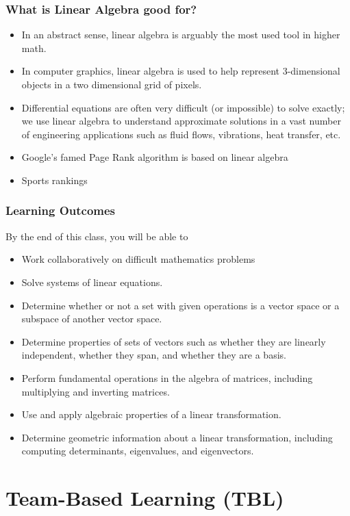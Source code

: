 \documentclass[aspectration=1610]{beamer}
\begin{document}
\begin{frame} \frametitle{What is Linear Algebra good for?}
\begin{itemize}
\item In an abstract sense, linear algebra is arguably the most used tool in higher math.
\item In computer graphics, linear algebra is used to help represent 3-dimensional objects in a two dimensional grid of pixels.
\item Differential equations are often very difficult (or impossible) to solve exactly; we use linear algebra to understand approximate solutions in a vast number of engineering applications such as fluid flows, vibrations, heat transfer, etc.
\item Google's famed Page Rank algorithm is based on linear algebra
\item Sports rankings 
\end{itemize}
\end{frame}

\begin{frame} \frametitle{Learning Outcomes }
By the end of this class, you will be able to
\begin{itemize}
\item Work collaboratively on difficult mathematics problems
\pause \item Solve systems of linear equations.
\pause \item Determine whether or not a set with given operations is a vector space or a subspace of another vector space.
\pause \item Determine properties of sets of vectors such as whether they are linearly independent, whether they span, and whether they are a basis.
\pause \item Perform fundamental operations in the algebra of matrices, including multiplying and inverting matrices.
\pause \item Use and apply algebraic properties of a linear transformation.
\pause \item Determine geometric information about a linear transformation, including computing determinants, eigenvalues, and eigenvectors.
\end{itemize}
\end{frame}





  \section{Team-Based Learning (TBL)}
\end{document}
